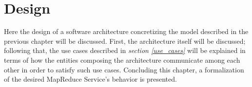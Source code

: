 \chapter{Design}
Here the design of a software architecture concretizing the model described in the previous chapter will be discussed.
First, the architecture itself will be discussed; following that, the use cases described in \textit{section \ref{use_cases}} will be explained in terms of how the entities composing the architecture communicate among each other in order to satisfy such use cases. Concluding this chapter, a formalization of the desired MapReduce Service's behavior is presented.



